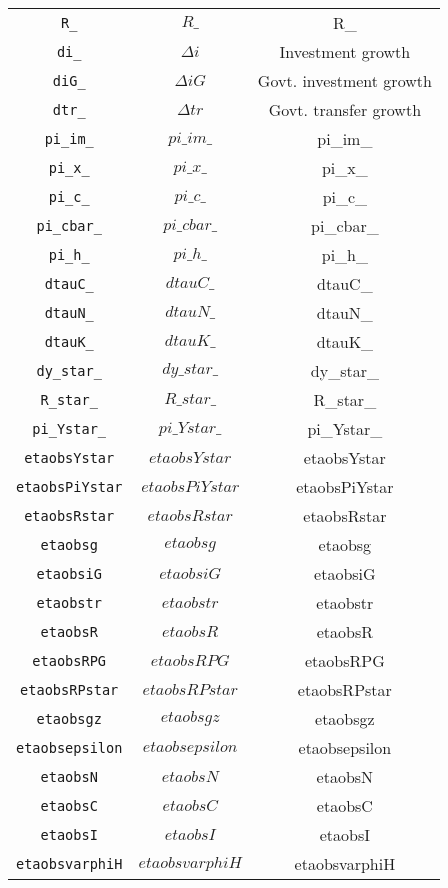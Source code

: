 \begin{center}
\begin{longtable}{ccc}
\texttt{R\_} & $R\_$ & R\_\\
\texttt{di\_} & $\Delta{i}$ & Investment growth\\
\texttt{diG\_} & $\Delta{iG}$ & Govt. investment growth\\
\texttt{dtr\_} & $\Delta{tr}$ & Govt. transfer growth\\
\texttt{pi\_im\_} & $pi\_im\_$ & pi\_im\_\\
\texttt{pi\_x\_} & $pi\_x\_$ & pi\_x\_\\
\texttt{pi\_c\_} & $pi\_c\_$ & pi\_c\_\\
\texttt{pi\_cbar\_} & $pi\_cbar\_$ & pi\_cbar\_\\
\texttt{pi\_h\_} & $pi\_h\_$ & pi\_h\_\\
\texttt{dtauC\_} & $dtauC\_$ & dtauC\_\\
\texttt{dtauN\_} & $dtauN\_$ & dtauN\_\\
\texttt{dtauK\_} & $dtauK\_$ & dtauK\_\\
\texttt{dy\_star\_} & $dy\_star\_$ & dy\_star\_\\
\texttt{R\_star\_} & $R\_star\_$ & R\_star\_\\
\texttt{pi\_Ystar\_} & $pi\_Ystar\_$ & pi\_Ystar\_\\
\texttt{etaobsYstar} & $etaobsYstar$ & etaobsYstar\\
\texttt{etaobsPiYstar} & $etaobsPiYstar$ & etaobsPiYstar\\
\texttt{etaobsRstar} & $etaobsRstar$ & etaobsRstar\\
\texttt{etaobsg} & $etaobsg$ & etaobsg\\
\texttt{etaobsiG} & $etaobsiG$ & etaobsiG\\
\texttt{etaobstr} & $etaobstr$ & etaobstr\\
\texttt{etaobsR} & $etaobsR$ & etaobsR\\
\texttt{etaobsRPG} & $etaobsRPG$ & etaobsRPG\\
\texttt{etaobsRPstar} & $etaobsRPstar$ & etaobsRPstar\\
\texttt{etaobsgz} & $etaobsgz$ & etaobsgz\\
\texttt{etaobsepsilon} & $etaobsepsilon$ & etaobsepsilon\\
\texttt{etaobsN} & $etaobsN$ & etaobsN\\
\texttt{etaobsC} & $etaobsC$ & etaobsC\\
\texttt{etaobsI} & $etaobsI$ & etaobsI\\
\texttt{etaobsvarphiH} & $etaobsvarphiH$ & etaobsvarphiH\\

\end{longtable}
\end{center}
